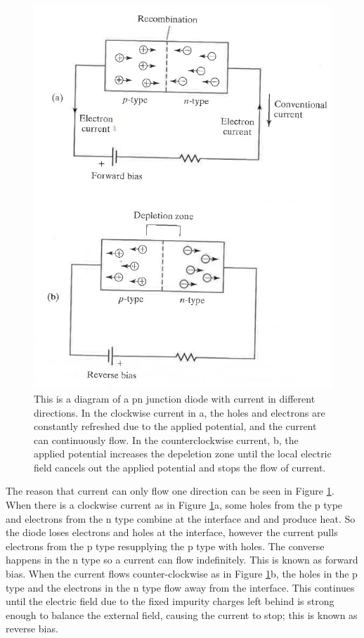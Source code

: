 \documentclass[ notitlepage, numerical, 11pt]{revtex4-1} %
\begin{document}
\begin{figure}[H]
\centerline{\includegraphics[scale=.7]{pnJunction.png}}
\caption{This is a diagram of a pn junction diode with current in different directions. In the clockwise current in a, the holes and electrons are constantly refreshed due to the applied potential, and the current can continuously flow. In the counterclockwise current, b, the applied potential increases the depeletion zone until the local electric field cancels out the applied potential and stops the flow of current.}
\label{pnJunction}
\end{figure}

The reason that current can only flow one direction can be seen in Figure \ref{pnJunction}. When there is a clockwise current as in Figure \ref{pnJunction}a, some holes from the p type and electrons from the n type combine at the interface and and produce heat.  So the diode loses electrons and holes at the interface, however the current pulls electrons from the p type resupplying the p type with holes. The converse happens in the n type so a current can flow indefinitely. This is known as forward bias. When the current flows counter-clockwise as in Figure \ref{pnJunction}b, the holes in the p type and the electrons in the n type flow away from the interface. This continues until the electric field due to the fixed impurity charges left behind is strong enough to balance the external field, causing the current to stop; this is known as reverse bias. 
\end{document}
